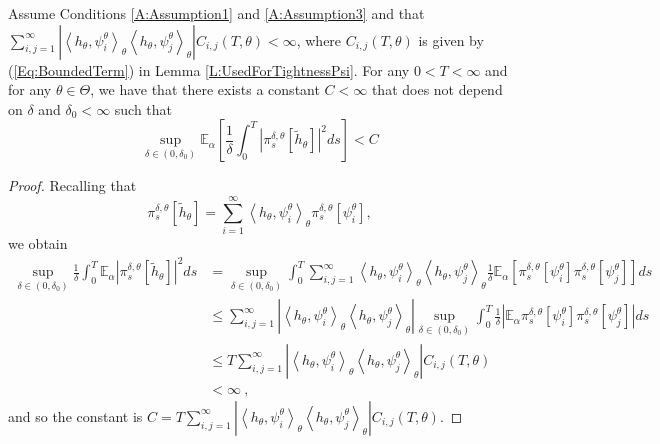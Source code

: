\documentclass{article}
\begin{document}
\begin{lemma}\label{L:UsedForTightness}
Assume Conditions \ref{A:Assumption1} and \ref{A:Assumption3} and that $\sum_{i,j=1}^{\infty}\left|\left<h_{\theta},\psi_i^{\theta}\right>_{\theta}\left<h_{\theta},\psi_j^{\theta}\right>_{\theta}\right|C_{i,j}(T,\theta)<\infty$, where
$C_{i,j}(T,\theta)$ is given by (\ref{Eq:BoundedTerm}) in Lemma \ref{L:UsedForTightnessPsi}. For any $0<T<\infty$ and for any $\theta\in\Theta$, we have that there exists a constant $C<\infty$ that does not depend on $\delta$ and $\delta_{0}<\infty $ such that
\[
\sup_{\delta\in(0,\delta_{0})}\mathbb{E}_{\alpha}\left[\frac{1}{\delta}\int_{0}^{T}\left|\pi_s^{\delta,\theta}[\tilde h_{\theta}]\right|^{2}ds\right]<C
\]
\end{lemma}
\begin{proof}
Recalling that
\[
\pi_s^{\delta,\theta}[\tilde h_{\theta}]=\sum_{i=1}^{\infty}\left<h_{\theta},\psi_i^{\theta}\right>_{\theta} \pi_s^{\delta,\theta}[\psi_i^{\theta}],
\]
we obtain
\begin{align}
\sup_{\delta\in(0,\delta_{0})}\frac{1}{\delta}\int_0^T\mathbb E_\alpha\left|\pi_s^{\delta,\theta}[\tilde h_{\theta}]\right|^{2}ds&=\sup_{\delta\in(0,\delta_{0})}\int_0^T\sum_{i,j=1}^{\infty}\left<h_{\theta},\psi_i^{\theta}\right>_{\theta}\left<h_{\theta},\psi_j^{\theta}\right>_{\theta} \frac{1}{\delta}\mathbb E_\alpha\left[\pi_s^{\delta,\theta}[\psi_i^{\theta}]\pi_s^{\delta,\theta}[\psi_j^{\theta}]\right]ds\nonumber\\
&\leq \sum_{i,j=1}^{\infty}\left|\left<h_{\theta},\psi_i^{\theta}\right>_{\theta}\left<h_{\theta},\psi_j^{\theta}\right>_{\theta} \right|\sup_{\delta\in(0,\delta_{0})}\int_0^T\frac{1}{\delta}\left|\mathbb E_\alpha\pi_s^{\delta,\theta}[\psi_i^{\theta}]\pi_s^{\delta,\theta}[\psi_j^{\theta}]\right|ds\nonumber\\
&\leq T\sum_{i,j=1}^{\infty}\left|\left<h_{\theta},\psi_i^{\theta}\right>_{\theta}\left<h_{\theta},\psi_j^{\theta}\right>_{\theta}\right|C_{i,j}(T,\theta) \nonumber\\
&<\infty\ ,
\nonumber
\end{align}
and so the constant is $C=T\sum_{i,j=1}^{\infty}\left|\left<h_{\theta},\psi_i^{\theta}\right>_{\theta}\left<h_{\theta},\psi_j^{\theta}\right>_{\theta}\right|C_{i,j}(T,\theta)$.
\end{proof}
\end{document}
